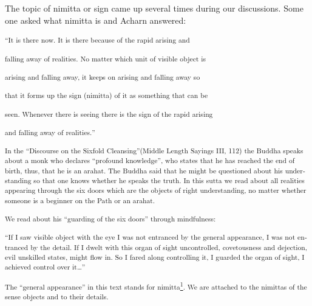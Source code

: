 \textenglish[variant=american]{The topic of nimitta or sign came up
several times during our discussions. }\textdutch{Some one asked
}\textenglish[variant=american]{what nimitta is}\textdutch{ and Acharn
answered:}

\textsuperscript{``\textenglish[variant=american]{It is there now. It is
there because of the rapid arising and}}

\textsuperscript{\textenglish[variant=american]{falling away of
realities. No matter which unit of visible object is}}

\textsuperscript{\textenglish[variant=american]{arising and falling
away, it keeps on arising and falling away so}}

\textsuperscript{\textenglish[variant=american]{that it forms up the
sign (nimitta) of it as something that can be}}

\textsuperscript{\textenglish[variant=american]{seen. Whenever there is
seeing there is the sign of the rapid arising}}

\textsuperscript{\textenglish[variant=american]{and falling away of
realities.}\textdutch{''}}

\textsuperscript{\textenglish[variant=american]{In the
}``\textenglish[variant=american]{Discourse on the Sixfold
Cleansing}''\textenglish[variant=american]{(Middle Length Sayings III,
112) the Buddha speaks about a monk who declares
}``\textenglish[variant=american]{profound
knowledge}''\textenglish[variant=american]{, who states that he has
reached the end of birth, thus, that he is an arahat. The Buddha said
that he might be questioned about his understanding so that one knows
whether he speaks the truth. In this sutta we read about all realities
appearing through the six doors which are the objects of right
understanding, no matter whether someone is a beginner on the Path or an
arahat. }}

\textsuperscript{\textenglish[variant=american]{We read about his
}``\textenglish[variant=american]{guarding of the six doors}''
\textenglish[variant=american]{through mindfulness:}}

\textsuperscript{``\textenglish[variant=american]{If I saw visible
object with the eye I was not entranced by the general appearance, I was
not entranced by the detail. If I dwelt with this organ of sight
uncontrolled, covetousness and dejection, evil unskilled states, might
flow in. So I fared along controlling it, I guarded the organ of sight,
I achieved control over it}\textdutch{\ldots{}''}}

\textsuperscript{\textdutch{The ``general appearance'' in this text
stands for
nimitta\protect\hyperlink{sdfootnote1sym}{\textsuperscript{1}}. We are
attached to the nimittas of the sense objects and to their details. }}

